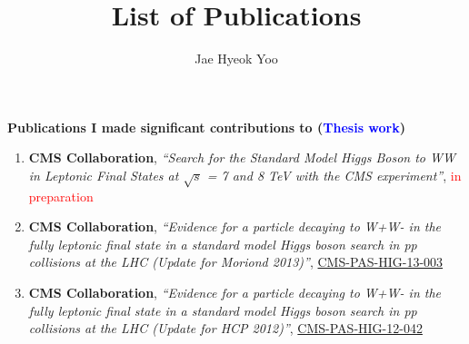 \documentclass[12pt,letter]{article}
\begin{document}
 

\title{List of Publications}
\author{Jae Hyeok Yoo}
\date{}

\maketitle

\newpage



\textbf{\large Publications I made significant contributions to 
(\textcolor{blue}{Thesis work})}
\\
\begin{enumerate}
\item 
\textbf{CMS Collaboration}, \textit{``Search for the Standard Model Higgs
Boson to WW in Leptonic Final States at $\sqrt{s}$ = 7 and 8 TeV with the CMS experiment''}, 
\textcolor{red}{in preparation}  

\item 
\textbf{CMS Collaboration}, \textit{``Evidence for a particle decaying to W+W- in the fully leptonic final state in a standard model Higgs boson search in pp collisions at the LHC (Update for Moriond 2013)''}, 
\href{http://cds.cern.ch/record/1523673/files/HIG-13-003-pas.pdf}{CMS-PAS-HIG-13-003} 

\item 
\textbf{CMS Collaboration}, \textit{``Evidence for a particle decaying to W+W- in the fully leptonic final state in a standard model Higgs boson search in pp collisions at the LHC (Update for HCP 2012)''},  
\href{http://cds.cern.ch/record/1493602/files/HIG-12-042-pas.pdf}{CMS-PAS-HIG-12-042}  
\\
\\
\end{enumerate}
\end{document}
